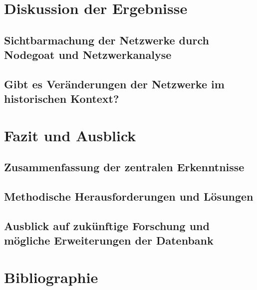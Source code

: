 \documentclass[12pt, a4paper, ngerman, bidi=default]{article}
\begin{document}
\section{Diskussion der Ergebnisse}
  \subsection{Sichtbarmachung der Netzwerke durch Nodegoat und Netzwerkanalyse}
  \subsection{Gibt es Veränderungen der Netzwerke im historischen Kontext?}
  \newpage
\section{Fazit und Ausblick}
\subsection{Zusammenfassung der zentralen Erkenntnisse}
\subsection{Methodische Herausforderungen und Lösungen}
\subsection{Ausblick auf zukünftige Forschung und mögliche Erweiterungen der Datenbank}
\newpage
\section{Bibliographie}
\printbibliography[
heading=bibintoc,
title={References} %
]
\end{document}
